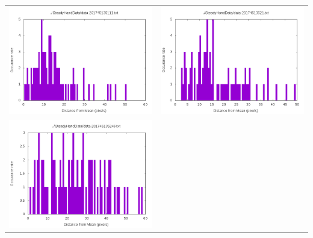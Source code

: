 \documentclass[12pt,letterpaper]{article}
\begin{document}
\begin{table}
\begin{tabular}{cc}
\includegraphics[scale=.5]{graph-data-201745135111.png} &
\includegraphics[scale=.5]{graph-data-20174513521.png}\\
\includegraphics[scale=.5]{graph-data-201745135246.png} &

\end{tabular}
\end{table}
\end{document}
